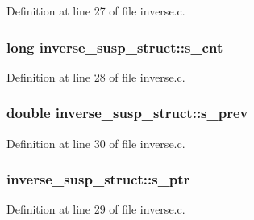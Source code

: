 Definition at line 27 of file inverse.\+c.

\subsubsection[{\texorpdfstring{s\+\_\+cnt}{s_cnt}}]{\setlength{\rightskip}{0pt plus 5cm}long inverse\+\_\+susp\+\_\+struct\+::s\+\_\+cnt}\hypertarget{structinverse__susp__struct_afa1ae7c0882c610e616f285cf93db762}{}\label{structinverse__susp__struct_afa1ae7c0882c610e616f285cf93db762}


Definition at line 28 of file inverse.\+c.

\subsubsection[{\texorpdfstring{s\+\_\+prev}{s_prev}}]{\setlength{\rightskip}{0pt plus 5cm}double inverse\+\_\+susp\+\_\+struct\+::s\+\_\+prev}\hypertarget{structinverse__susp__struct_a02fa4f43e6e0989f887263bf7a0ba2ed}{}\label{structinverse__susp__struct_a02fa4f43e6e0989f887263bf7a0ba2ed}


Definition at line 30 of file inverse.\+c.

\subsubsection[{\texorpdfstring{s\+\_\+ptr}{s_ptr}}]{ inverse\+\_\+susp\+\_\+struct\+::s\+\_\+ptr}\hypertarget{structinverse__susp__struct_a3ef6bc40880154d13de858fe604d63e2}{}\label{structinverse__susp__struct_a3ef6bc40880154d13de858fe604d63e2}


Definition at line 29 of file inverse.\+c.


